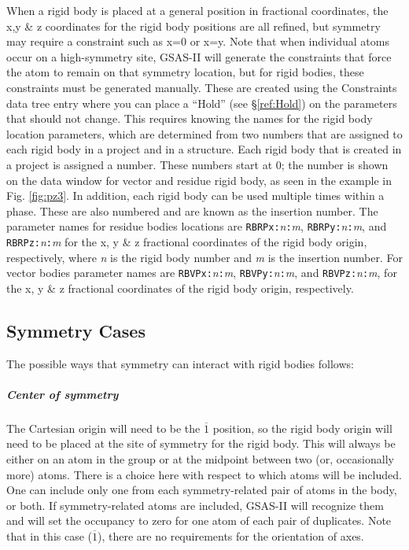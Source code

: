 When a rigid body is placed at a general position in fractional coordinates, the x,y \& z coordinates for the rigid body positions are all refined, but symmetry may require a constraint such as x=0 or x=y. Note that when individual atoms occur on a high-symmetry site, GSAS-II will generate the constraints that force the atom to remain on that symmetry location, but for rigid bodies, these constraints must be generated manually. These are created using the Constraints data tree entry where you can place a ``Hold'' (see \S\ref{ref:Hold}) on the parameters that should not change. This requires knowing the names for the rigid body location parameters, which are determined from two numbers that are assigned to each rigid body in a project and in a structure. Each rigid body that is created in a project is assigned a number. These numbers start at 0; the number is shown on the data window for vector and residue rigid body, as seen in the example in Fig. \ref{fig:pz3}. In addition, each rigid body can be used multiple times within a phase. These are also numbered and are known as the insertion number. 
The parameter names for residue bodies locations are \texttt{RBRPx:}\textit{n}\texttt{:}\textit{m}, \texttt{RBRPy:}\textit{n}\texttt{:}\textit{m}, and \texttt{RBRPz:}\textit{n}\texttt{:}\textit{m} for the x, y \& z fractional coordinates of the rigid body origin, respectively, 
where \textit{n} is the rigid body number and \textit{m} is the insertion number.
For vector bodies parameter names are 
\texttt{RBVPx:}\textit{n}\texttt{:}\textit{m}, \texttt{RBVPy:}\textit{n}\texttt{:}\textit{m}, and \texttt{RBVPz:}\textit{n}\texttt{:}\textit{m},
for the x, y \& z fractional coordinates of the rigid body origin, respectively. 

\subsection{Symmetry Cases}
The possible ways that symmetry can interact with rigid bodies follows:

\subparagraph{Center of symmetry} The Cartesian origin will need to be the $\overline{1}$ position, so the rigid body origin will need to be placed at the site of symmetry for the rigid body. 
This will always be either on an atom in the group or at the midpoint between two (or, occasionally more) atoms. 
There is a choice here with respect to which atoms will be included. One can include only one from each symmetry-related pair of atoms in the body, or both. If symmetry-related atoms are included, GSAS-II will recognize them and will set the occupancy to zero for one atom of each pair of duplicates. Note that in this case ($\overline{1}$), there are no requirements for the orientation of axes.

